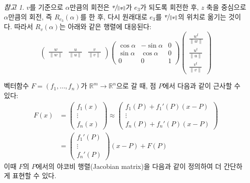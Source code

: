 \documentclass[unfonts,oneside,a4paper]{oblivoir}
\theoremstyle{definition}
\theoremstyle{theorem}
\theoremstyle{theorem}
\theoremstyle{remark}
\newtheorem*{remark}{참고}
\theoremstyle{remark}
\theoremstyle{remark}
\theoremstyle{remark}
\renewcommand{\vec}[1]{\bm{\mathit{#1}}}
\begin{document}
\begin{remark}
    $\vec v$를 기준으로 $\alpha$만큼의 회전은 $\sfrac{\vec v}{\lVert \vec v\rVert}$가 $\vec e_3$가 되도록 회전한 후, $z$ 축을 중심으로 $\alpha$만큼의 회전, 즉 $R_{\vec e_3}(\alpha)$를 한 후, 다시 원래대로 $\vec e_3$를 $\sfrac{\vec v}{\lVert \vec v\rVert}$의 위치로 옮기는 것이다.
    따라서 $R_{\vec v}(\alpha)$는 아래와 같은 행렬에 대응된다:
    \begin{equation*}
        \begin{pmatrix}
            \frac{\vec w}{\lVert \vec w \rVert} & \frac{\vec u}{\lVert \vec u \rVert} & \frac{\vec v}{\lVert \vec v \rVert}
        \end{pmatrix}
        \begin{pmatrix}
            \cos \alpha & -\sin \alpha & 0\\
            \sin \alpha & \cos \alpha & 0\\
            0 & 0 & 1
        \end{pmatrix}
        \begin{pmatrix}
            \frac{\vec w^t}{\lVert \vec w \rVert} \\ \frac{\vec u^t}{\lVert \vec u \rVert} \\ \frac{\vec v^t}{\lVert \vec v \rVert}
        \end{pmatrix}
    \end{equation*}
\end{remark}

벡터함수 $\vec F = (f_1, \dots, f_n)$가 $\mathbb R^m \rightarrow \mathbb R^n$으로 갈 때, 점 $P$에서 다음과 같이 근사할 수 있다:
\begin{align*}
    \vec F(\vec x) &=
    \begin{pmatrix}
        f_1(\vec x) \\ \vdots \\ f_n(\vec x)
    \end{pmatrix}
    \approx
    \begin{pmatrix}
        f_1(P) + f_1'(P) (\vec x - P)\\
        \vdots\\
        f_n(P) + f_n'(P) (\vec x - P)
    \end{pmatrix}\\
              &=
              \begin{pmatrix}
                  f_1'(P) \\ \vdots \\ f_n'(P)
              \end{pmatrix}
              (\vec x - P) + \vec F(P)
\end{align*}
이때 $\vec F$의 $P$에서의 야코비 행렬(Jacobian matrix)을 다음과 같이 정의하여 더 간단하게 표현할 수 있다.
\end{document}
